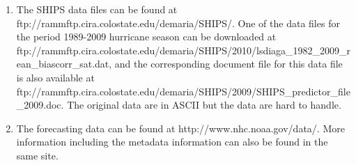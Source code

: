 \documentclass[11pt]{article}
\begin{document}
\begin{enumerate}
\def\labelenumi{\arabic{enumi}.}
\item
  The SHIPS data files can be found at
  ftp://rammftp.cira.colostate.edu/demaria/SHIPS/. One of the data files
  for the period 1989-2009 hurricane season can be downloaded at
  ftp://rammftp.cira.colostate.edu/demaria/SHIPS/2010/lsdiaga\_1982\_2009\_rean\_biascorr\_sat.dat,
  and the corresponding document file for this data file is also
  available at
  ftp://rammftp.cira.colostate.edu/demaria/SHIPS/2009/SHIPS\_predictor\_file\_2009.doc.
  The original data are in ASCII but the data are hard to handle.
\item
  The forecasting data can be found at http://www.nhc.noaa.gov/data/.
  More information including the metadata information can also be found
  in the same site.
\end{enumerate}

\vskip 0.2in


    
    
    
    
\end{document}
